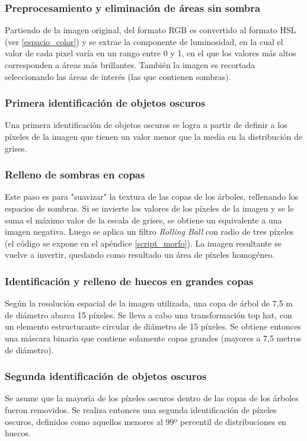 \subsubsection{Preprocesamiento y eliminación de áreas sin sombra}
Partiendo de la imagen original, del formato RGB es convertido al formato HSL (ver \ref{espacio_color}) y se extrae la componente de luminosidad, en la cual el valor de cada pixel varía en un rango entre 0 y 1, en el que los valores más altos corresponden a áreas más brillantes. También la imagen es recortada seleccionando las áreas de interés (las que contienen sombras).
\subsubsection{Primera identificación de objetos oscuros}
Una primera identificación de objetos oscuros se logra a partir de definir a los píxeles de la imagen que tienen un valor menor que la media en la distribución de grises.
\subsubsection{Relleno de sombras en copas}
Este paso es para "suavizar" la textura de las copas de los árboles, rellenando los espacios de sombras.
Si se invierte los valores de los píxeles de la imagen y se le suma el máximo valor de la escala de grises, se obtiene un equivalente a una imagen negativa. Luego se aplica un filtro \textit{Rolling Ball} con radio de tres píxeles (el código se expone en el apéndice \ref{script_morfo}). La imagen resultante se vuelve a invertir, quedando como resultado un área de píxeles homogéneo.
\subsubsection{Identificación y relleno de huecos en grandes copas}
Según la resolución espacial de la imagen utilizada, una copa de árbol de 7,5 m de diámetro abarca 15 píxeles. Se lleva a cabo una transformación top hat, con un elemento estructurante circular de diámetro de 15 píxeles. Se obtiene entonces una máscara binaria que contiene solamente copas grandes (mayores a 7,5 metros de diámetro).
\subsubsection{ Segunda identificación de objetos oscuros}
Se asume que la mayoría de los píxeles oscuros dentro de las copas de los árboles fueron removidos. Se realiza entonces una segunda identificación de píxeles oscuros, definidos como aquellos menores al 99º percentil de distribuciones en huecos.
